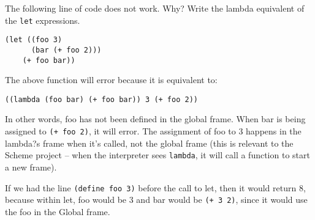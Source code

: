 \begin{blocksection}
\question The following line of code does not work. Why? Write the lambda
equivalent of the \texttt{let} expressions.

\begin{lstlisting}
(let ((foo 3)
      (bar (+ foo 2)))
    (+ foo bar))
\end{lstlisting}
\begin{solution}[0.5in]
The above function will error because it is equivalent to:
\begin{lstlisting}
((lambda (foo bar) (+ foo bar)) 3 (+ foo 2))
\end{lstlisting}

In other words, foo has not been defined in the global frame. When bar is being
assigned to \texttt{(+ foo 2)}, it will error. The assignment of foo to 3
happens in the lambda?s frame when it's called, not the global frame (this is
relevant to the Scheme project -- when the interpreter sees \texttt{lambda}, it
will call a function to start a new frame).

If we had the line \texttt{(define foo 3)} before the call to let, then it would
return 8, because within let, foo would be 3 and bar would be \texttt{(+ 3 2)},
since it would use the foo in the Global frame.
\end{solution}

\end{blocksection}

